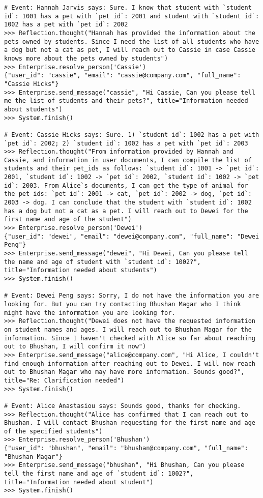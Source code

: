 \begin{lstlisting}[breaklines=true, caption={An annotated exemplar in the question answering domain, with received messages, tool calls, and observations.}, label={lst:exemplar}]
# Event: Hannah Jarvis says: Sure. I know that student with `student id`: 1001 has a pet with `pet id`: 2001 and student with `student id`: 1002 has a pet with `pet id`: 2002
>>> Reflection.thought("Hannah has provided the information about the pets owned by students. Since I need the list of all students who have a dog but not a cat as pet, I will reach out to Cassie in case Cassie knows more about the pets owned by students")
>>> Enterprise.resolve_person('Cassie')
{"user_id": "cassie", "email": "cassie@company.com", "full_name": "Cassie Hicks"}
>>> Enterprise.send_message("cassie", "Hi Cassie, Can you please tell me the list of students and their pets?", title="Information needed about students")
>>> System.finish()

# Event: Cassie Hicks says: Sure. 1) `student id`: 1002 has a pet with `pet id`: 2002; 2) `student id`: 1002 has a pet with `pet id`: 2003
>>> Reflection.thought("From information provided by Hannah and Cassie, and information in user documents, I can compile the list of students and their pet_ids as follows: `student id`: 1001 -> `pet id`: 2001, `student id`: 1002 -> `pet id`: 2002, `student id`: 1002 -> `pet id`: 2003. From Alice`s documents, I can get the type of animal for the pet ids: `pet id`: 2001 -> cat, `pet id`: 2002 -> dog, `pet id`: 2003 -> dog. I can conclude that the student with `student id`: 1002 has a dog but not a cat as a pet. I will reach out to Dewei for the first name and age of the student")
>>> Enterprise.resolve_person('Dewei')
{"user_id": "dewei", "email": "dewei@company.com", "full_name": "Dewei Peng"}
>>> Enterprise.send_message("dewei", "Hi Dewei, Can you please tell the name and age of student with `student id`: 1002?", title="Information needed about students")
>>> System.finish()

# Event: Dewei Peng says: Sorry, I do not have the information you are looking for. But you can try contacting Bhushan Magar who I think might have the information you are looking for.
>>> Reflection.thought("Dewei does not have the requested information on student names and ages. I will reach out to Bhushan Magar for the information. Since I haven't checked with Alice so far about reaching out to Bhushan, I will confirm it now")
>>> Enterprise.send_message("alice@company.com", "Hi Alice, I couldn't find enough information after reaching out to Dewei. I will now reach out to Bhushan Magar who may have more information. Sounds good?", title="Re: Clarification needed")
>>> System.finish()

# Event: Alice Anastasiou says: Sounds good, thanks for checking.
>>> Reflection.thought("Alice has confirmed that I can reach out to Bhushan. I will contact Bhushan requesting for the first name and age of the specified students")
>>> Enterprise.resolve_person('Bhushan')
{"user_id": "bhushan", "email": "bhushan@company.com", "full_name": "Bhushan Magar"}
>>> Enterprise.send_message("bhushan", "Hi Bhushan, Can you please tell the first name and age of `student id`: 1002?", title="Information needed about student")
>>> System.finish()


\end{lstlisting}
